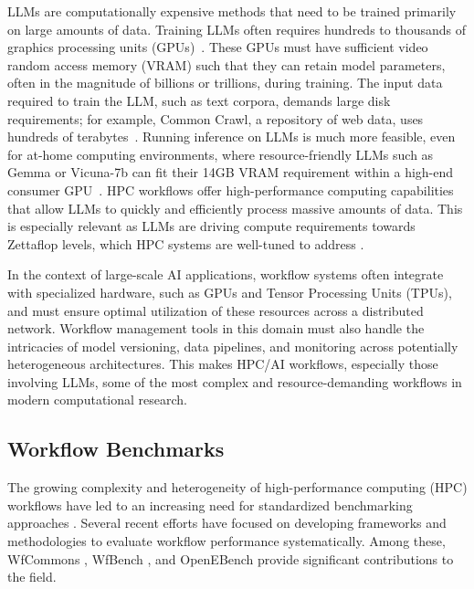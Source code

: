 \documentclass[sigconf]{acmart}
\begin{document}
LLMs are computationally expensive methods that need to be trained primarily on large amounts of data. Training LLMs often requires hundreds to thousands of graphics processing units (GPUs)~\citep{jiang2024megascalescalinglargelanguage}. These GPUs must have sufficient video random access memory (VRAM) such that they can retain model parameters, often in the magnitude of billions or trillions, during training. The input data required to train the LLM, such as text corpora, demands large disk requirements; for example, Common Crawl, a repository of web data, uses hundreds of terabytes~\citep{8311752}. Running inference on LLMs is much more feasible, even for at-home computing environments, where resource-friendly LLMs such as Gemma \citep{gemma} or Vicuna-7b can fit their 14GB VRAM requirement within a high-end consumer GPU~\citep{xu2024surveyresourceefficientllmmultimodal}.
HPC workflows offer high-performance computing capabilities that allow LLMs to quickly and efficiently process massive amounts of data. This is especially relevant as LLMs are driving compute requirements towards Zettaflop levels, which HPC systems are well-tuned to address \citep{ferreira_da_silva2024}.

In the context of large-scale AI applications, workflow systems often integrate with specialized hardware, such as GPUs and Tensor Processing Units (TPUs), and must ensure optimal utilization of these resources across a distributed network. Workflow management tools in this domain must also handle the intricacies of model versioning, data pipelines, and monitoring across potentially heterogeneous architectures. This makes HPC/AI workflows, especially those involving LLMs, some of the most complex and resource-demanding workflows in modern computational research.


\subsection{Workflow Benchmarks}

The growing complexity and heterogeneity of high-performance computing (HPC) workflows have led to an increasing need for standardized benchmarking approaches \citep{badia2024integrating}. Several recent efforts have focused on developing frameworks and methodologies to evaluate workflow performance systematically. Among these, WfCommons \citep{coleman2022-1}, WfBench \citep{coleman2022-2}, and OpenEBench \citep{Capella-Gutierrez2017} provide significant contributions to the field.
\end{document}
